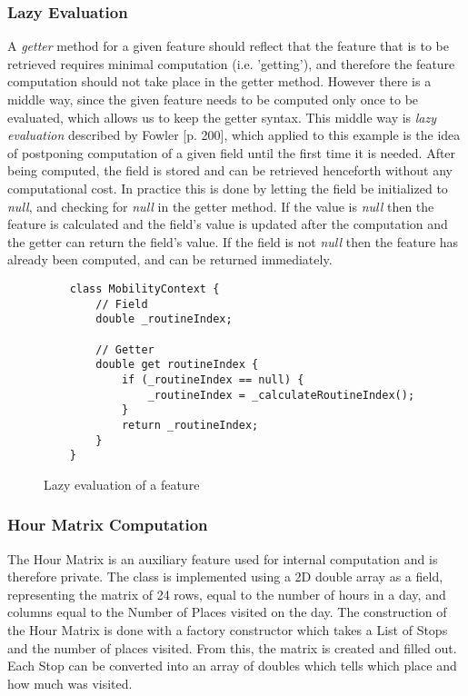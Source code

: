 \subsubsection{Lazy Evaluation}
A \textit{getter} method for a given feature should reflect that the feature that is to be retrieved requires minimal computation (i.e. 'getting'), and therefore the feature computation should not take place in the getter method. However there is a middle way, since the given feature needs to be computed only once to be evaluated, which allows us to keep the getter syntax. This middle way is \textit{lazy evaluation} described by Fowler \cite{fowler-PEEA} [p. 200], which applied to this example is the idea of postponing computation of a given field until the first time it is needed. After being computed, the field is stored and can be retrieved henceforth without any computational cost. In practice this is done by letting the field be initialized to \textit{null}, and checking for \textit{null} in the getter method. If the value is \textit{null} then the feature is calculated and the field's value is updated after the computation and the getter can return the field's value. If the field is not \textit{null} then the feature has already been computed, and can be returned immediately.

\begin{figure}
    \centering
    \begin{verbatim}
    class MobilityContext {
        // Field
        double _routineIndex;
        
        // Getter
        double get routineIndex {
            if (_routineIndex == null) {
                _routineIndex = _calculateRoutineIndex();
            }
            return _routineIndex;
        }
    }
    \end{verbatim}
    \caption{Lazy evaluation of a feature}
    \label{fig:lazy-evaluation}
\end{figure}

\subsubsection{Hour Matrix Computation}
The Hour Matrix is an auxiliary feature used for internal computation and is therefore private. The class is implemented using a 2D double array as a field, representing the matrix of 24 rows, equal to the number of hours in a day, and columns equal to the Number of Places visited on the day. The construction of the Hour Matrix is done with a factory constructor which takes a List of Stops and the number of places visited. From this, the matrix is created and filled out. Each Stop can be converted into an array of doubles which tells which place and how much was visited.

